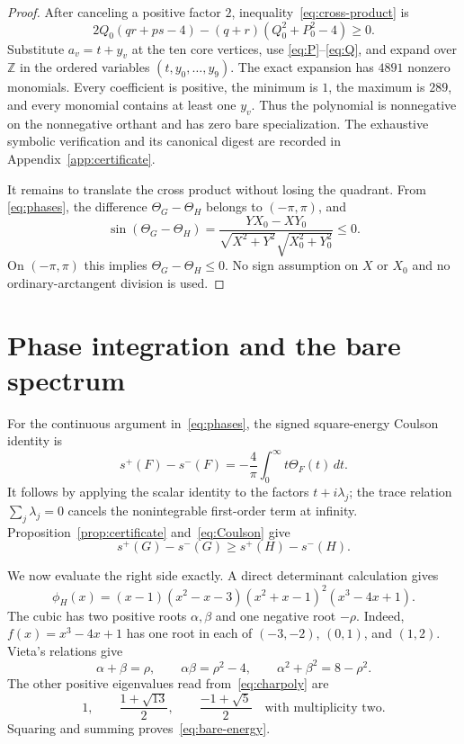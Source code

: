 \documentclass[11pt]{article}
\theoremstyle{remark}
\begin{document}
\begin{proof}
After canceling a positive factor $2$, inequality~\eqref{eq:cross-product}
is
\begin{equation}\label{eq:certificate-polynomial}
 2Q_0(qr+ps-4)-(q+r)(Q_0^2+P_0^2-4)\geq0.
\end{equation}
Substitute $a_v=t+y_v$ at the ten core vertices, use
\eqref{eq:P}--\eqref{eq:Q}, and expand over $\mathbb Z$ in the ordered
variables $(t,y_0,\ldots,y_9)$.  The exact expansion has $4891$ nonzero
monomials.  Every coefficient is positive, the minimum is $1$, the maximum is
$289$, and every monomial contains at least one $y_v$.  Thus the polynomial
is nonnegative on the nonnegative orthant and has zero bare specialization.
The exhaustive symbolic verification and its canonical digest are recorded
in Appendix~\ref{app:certificate}.

It remains to translate the cross product without losing the quadrant.  From
\eqref{eq:phases}, the difference
$\Theta_G-\Theta_H$ belongs to $(-\pi,\pi)$, and
\[
 \sin(\Theta_G-\Theta_H)
 =\frac{YX_0-XY_0}{\sqrt{X^2+Y^2}\sqrt{X_0^2+Y_0^2}}
 \leq0.
\]
On $(-\pi,\pi)$ this implies $\Theta_G-\Theta_H\leq0$.  No sign assumption
on $X$ or $X_0$ and no ordinary-arctangent division is used.
\end{proof}

\section{Phase integration and the bare spectrum}

For the continuous argument in~\eqref{eq:phases}, the signed square-energy
Coulson identity is
\begin{equation}\label{eq:Coulson}
 s^+(F)-s^-(F)
 =-\frac4\pi\int_0^\infty t\Theta_F(t)\,dt.
\end{equation}
It follows by applying the scalar identity to the factors
$t+i\lambda_j$; the trace relation $\sum_j\lambda_j=0$ cancels the
nonintegrable first-order term at infinity.  Proposition~\ref{prop:certificate}
and~\eqref{eq:Coulson} give
\begin{equation}\label{eq:difference-comparison}
 s^+(G)-s^-(G)\geq s^+(H)-s^-(H).
\end{equation}

We now evaluate the right side exactly.  A direct determinant calculation
gives
\begin{equation}\label{eq:charpoly}
 \phi_H(x)=(x-1)(x^2-x-3)(x^2+x-1)^2(x^3-4x+1).
\end{equation}
The cubic has two positive roots $\alpha,\beta$ and one negative root
$-\rho$.  Indeed, $f(x)=x^3-4x+1$ has one root in each of
$(-3,-2)$, $(0,1)$, and $(1,2)$.  Vieta's relations give
\[
 \alpha+\beta=\rho,
 \qquad
 \alpha\beta=\rho^2-4,
 \qquad
 \alpha^2+\beta^2=8-\rho^2.
\]
The other positive eigenvalues read from~\eqref{eq:charpoly} are
\[
 1,
 \qquad \frac{1+\sqrt{13}}2,
 \qquad \frac{-1+\sqrt5}2\quad\text{with multiplicity two}.
\]
Squaring and summing proves~\eqref{eq:bare-energy}.
\end{document}
